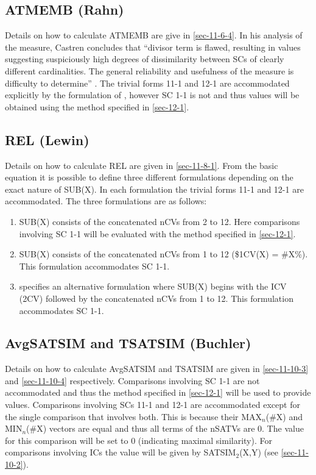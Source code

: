 \documentclass{article}
\begin{document}
\subsection{ATMEMB (Rahn)}
\label{sec-12-3}

Details on how to calculate ATMEMB are give in \ref{sec-11-6-4}. In his analysis
of the measure, Castren concludes that ``divisor term is flawed,
resulting in values suggesting suspiciously high degrees of
dissimilarity between SCs of clearly different cardinalities. The
general reliability and usefulness of the measure is difficulty to
determine'' \citep[pp. 89]{Castren1994}. The trivial forms 11-1 and
12-1 are accommodated explicitly by the formulation of
\citet{Rahn1979}, however SC 1-1 is not and thus values will be
obtained using the method specified in \ref{sec-12-1}.
\subsection{REL (Lewin)}
\label{sec-12-4}

Details on how to calculate REL are given in \ref{sec-11-8-1}. From the basic
equation it is possible to define three different formulations
depending on the exact nature of SUB(X). In each formulation the
trivial forms 11-1 and 12-1 are accommodated. The three formulations
are as follows:
\begin{enumerate}
\item SUB(X) consists of the concatenated nCVs from 2 to 12. Here
   comparisons involving SC 1-1 will be evaluated with the method
   specified in \ref{sec-12-1}.
\item SUB(X) consists of the concatenated nCVs from 1 to 12 (\$1CV(X) =
   \#X\%). This formulation accommodates SC 1-1.
\item \citet{Martorell2013} specifies an alternative formulation where
   SUB(X) begins with the ICV (2CV) followed by the concatenated nCVs
   from 1 to 12. This formulation accommodates SC 1-1.
\end{enumerate}
\subsection{AvgSATSIM and TSATSIM (Buchler)}
\label{sec-12-5}

Details on how to calculate AvgSATSIM and TSATSIM are given in
\ref{sec-11-10-3} and \ref{sec-11-10-4} respectively. Comparisons involving SC 1-1 are
not accommodated and thus the method specified in \ref{sec-12-1} will
be used to provide values. Comparisons involving SCs 11-1 and 12-1 are
accommodated except for the single comparison that involves both. This
is because their MAX$_{n}$(\#X) and MIN$_{n}$(\#X) vectors are equal and
thus all terms of the nSATVs are 0. The value for this comparison will
be set to 0 (indicating maximal similarity). For comparisons involving
ICs the value will be given by SATSIM$_{2}$(X,Y) (see \ref{sec-11-10-2}).
\end{document}
